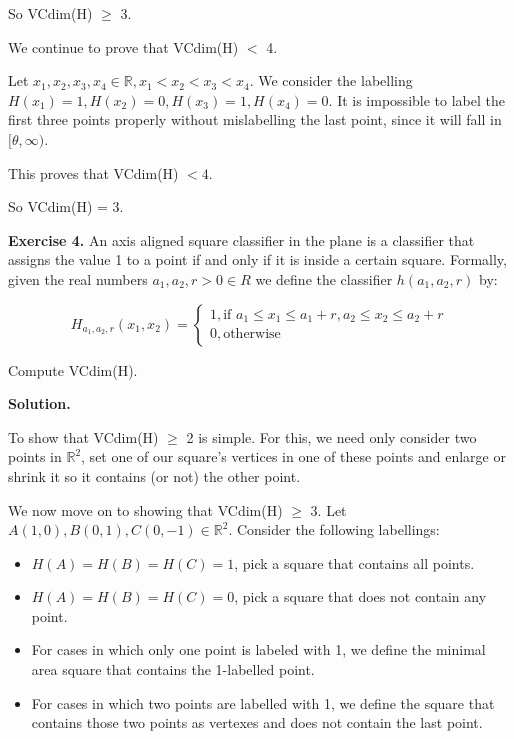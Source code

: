 \documentclass{article}
\newcommand{\<}{\langle}
\renewcommand{\>}{\rangle}
\theoremstyle{definition}
\begin{document}
So VCdim(H) $\geq$ 3.

We continue to prove that VCdim(H) $<$ 4.

Let $x_1, x_2, x_3, x_4 \in \mathbb{R}, x_1 < x_2 < x_3 < x_4$. We consider the labelling $H(x_1) = 1, H(x_2) = 0, H(x_3) = 1, H(x_4) = 0$. It is impossible to label the first three points properly without mislabelling the last point, since it will fall in $[\theta, \infty)$.

This proves that VCdim(H) $< 4$.

So VCdim(H) = 3.

\vspace{3mm}

\textbf{Exercise 4.} An axis aligned square classifier in the plane is a classifier that assigns the value 1 to a point if and only if it is inside a certain square. Formally, given the real numbers $a_1 , a_2 , r > 0 \in R$ we define the classifier $h (a_1, a_2, r)$ by:

$$H_{a_1, a_2, r} (x_1, x_2) = \begin{cases} 1, \text{if } a_1 \leq x_1 \leq a_1 + r, a_2 \leq x_2 \leq a_2 + r \\ 0, \text{otherwise} \end{cases}$$

Compute VCdim(H).

\textbf{Solution.}

To show that VCdim(H) $\geq$ 2 is simple. For this, we need only consider two points in $\mathbb{R}^2$, set one of our square's vertices in one of these points and enlarge or shrink it so it contains (or not) the other point. 

We now move on to showing that VCdim(H) $\geq$ 3. Let $A(1, 0), B(0, 1) , C(0, -1) \in \mathbb{R}^2$. Consider the following labellings:

\begin{itemize}
    \item[] $H(A) = H(B) = H(C) = 1$, pick a square that contains all points.
    \item[] $H(A) = H(B) = H(C) = 0$, pick a square that does not contain any point.
    \item[] For cases in which only one point is labeled with 1, we define the minimal area square that contains the 1-labelled point.
    \item[] For cases in which two points are labelled with 1, we define the square that contains those two points as vertexes and does not contain the last point.
\end{itemize}
\end{document}
